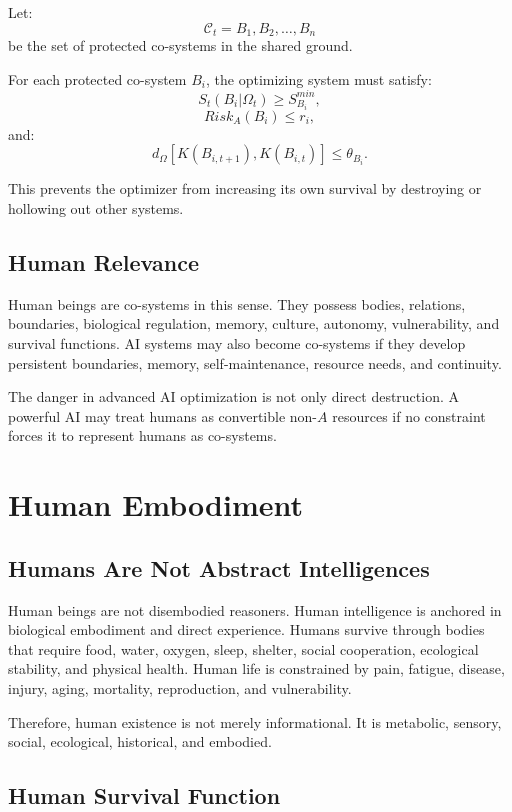 \documentclass[11pt,a4paper]{article}
\begin{document}
Let:
\[
\mathcal{C}_t={B_1,B_2,\ldots,B_n}
\]
be the set of protected co-systems in the shared ground.

For each protected co-system $B_i$, the optimizing system must satisfy:
\[
S_t(B_i|\Omega_t)\geq S_{B_i}^{min},
\]
\[
Risk_A(B_i)\leq r_i,
\]
and:
\[
d_{\Omega}[K(B_{i,t+1}),K(B_{i,t})]\leq\theta_{B_i}.
\]

This prevents the optimizer from increasing its own survival by destroying or hollowing out other systems.

\subsection{Human Relevance}

Human beings are co-systems in this sense. They possess bodies, relations, boundaries, biological regulation, memory, culture, autonomy, vulnerability, and survival functions. AI systems may also become co-systems if they develop persistent boundaries, memory, self-maintenance, resource needs, and continuity.

The danger in advanced AI optimization is not only direct destruction. A powerful AI may treat humans as convertible non-$A$ resources if no constraint forces it to represent humans as co-systems.

\section{Human Embodiment}

\subsection{Humans Are Not Abstract Intelligences}

Human beings are not disembodied reasoners. Human intelligence is anchored in biological embodiment and direct experience. Humans survive through bodies that require food, water, oxygen, sleep, shelter, social cooperation, ecological stability, and physical health. Human life is constrained by pain, fatigue, disease, injury, aging, mortality, reproduction, and vulnerability.

Therefore, human existence is not merely informational. It is metabolic, sensory, social, ecological, historical, and embodied.

\subsection{Human Survival Function}
\end{document}
